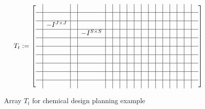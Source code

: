 \begin{figure}[ht]
\caption{Array $T_t$ for chemical design planning example}
\label{CHEM:tt}
\begin{multline*}
T_t:=\left[
\begin{array}{c|c|c|c|c|c|c|c|c|c|c|c|c|c|c|c|c}
	&&&&&&&&&&&&&&&&\\ \hline
	&&&&&&&&&&&&&&&&\\ \hline
	&-I^{J\times J}&&&&&&&&&&&&&&&\\ \hline
	&&&-I^{S\times S}&&&&&&&&&&&&&\\ \hline
	&&&&&&&&&&&&&&&&\\ \hline
	&&&&&&&&&&&&&&&&\\ \hline
	&&&&&&&&&&&&&&&&\\ \hline
	&&&&&&&&&&&&&&&&\\ \hline
	&&&&&&&&&&&&&&&&\\ \hline
	&&&&&&&&&&&&&&&&
\end{array}
\right]\\
\end{multline*}
\end{figure}%
